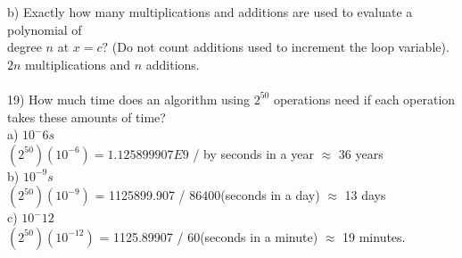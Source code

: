 \documentclass{article}
\begin{document}
\begin{flushleft}
\setlength\parindent{24pt}b) Exactly how many multiplications and additions are used to evaluate a polynomial of \\degree $n$ at $x = c?$  (Do not count additions used to increment the loop variable). \\
\setlength\parindent{48pt} $2n $ multiplications and $n$ additions. \\
~\\
\setlength\parindent{0pt}19) How much time does an algorithm using $2^{50}$ operations need if each operation takes these amounts of time? \\
\setlength\parindent{24pt}a) $10^-6s$ \\
\setlength\parindent{48pt} $(2^{50})(10^{-6}) = 1.125899907 E 9$ / by seconds in a year $ \approx $ 36 years \\
\setlength\parindent{24pt}b) $10^{-9}s$ \\
\setlength\parindent{48pt} $(2^{50})(10^{-9})$ = 1125899.907 / 86400(seconds in a day) $\approx $ 13 days \\
\setlength\parindent{24pt}c) $10^-12$ \\
\setlength\parindent{48pt} $(2^{50})(10^{-12})$ = 1125.89907 / 60(seconds in a minute) $\approx $ 19 minutes. \\


\end{flushleft}
\end{document}
